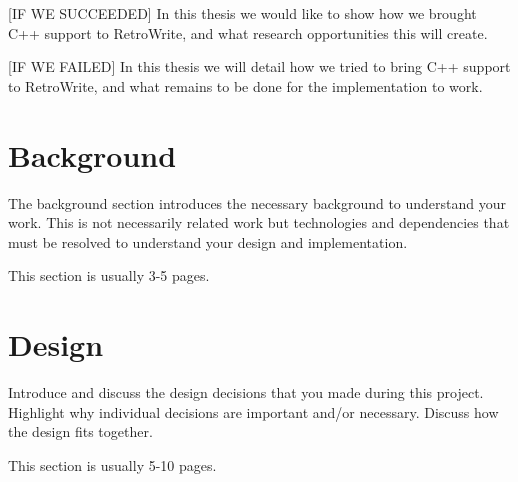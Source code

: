 \documentclass[a4paper,11pt,oneside]{report}
\begin{document}



[IF WE SUCCEEDED]
In this thesis we would like to show how we brought C++ support to RetroWrite, and what research opportunities this will create.

[IF WE FAILED]
In this thesis we will detail how we tried to bring C++ support to RetroWrite, and what remains to be done for the implementation to work.


\chapter{Background}

The background section introduces the necessary background to understand your
work. This is not necessarily related work but technologies and dependencies
that must be resolved to understand your design and implementation.

This section is usually 3-5 pages.






\chapter{Design}

Introduce and discuss the design decisions that you made during this project.
Highlight why individual decisions are important and/or necessary. Discuss
how the design fits together.

This section is usually 5-10 pages.



\end{document}
